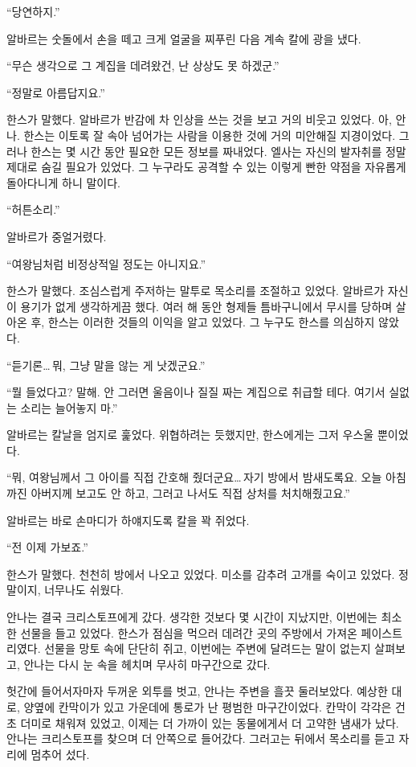 ``당연하지.''

알바르는 숫돌에서 손을 떼고 크게 얼굴을 찌푸린 다음 계속 칼에 광을 냈다.

``무슨 생각으로 그 계집을 데려왔건, 난 상상도 못 하겠군.''

``정말로 아름답지요.''

한스가 말했다. 알바르가 반감에 차 인상을 쓰는 것을 보고 거의 비웃고 있었다. 아, 안나. 한스는 이토록 잘 속아 넘어가는 사람을 이용한 것에 거의 미안해질 지경이었다. 그러나 한스는 몇 시간 동안 필요한 모든 정보를 짜내었다. 엘사는 자신의 발자취를 정말 제대로 숨길 필요가 있었다. 그 누구라도 공격할 수 있는 이렇게 빤한 약점을 자유롭게 돌아다니게 하니 말이다.

``허튼소리.''

알바르가 중얼거렸다.

``여왕님처럼 비정상적일 정도는 아니지요.''

한스가 말했다. 조심스럽게 주저하는 말투로 목소리를 조절하고 있었다. 알바르가 자신이 용기가 없게 생각하게끔 했다. 여러 해 동안 형제들 틈바구니에서 무시를 당하며 살아온 후, 한스는 이러한 것들의 이익을 알고 있었다. 그 누구도 한스를 의심하지 않았다.

``듣기론\ldots\,뭐, 그냥 말을 않는 게 낫겠군요.''

``뭘 들었다고? 말해. 안 그러면 울음이나 질질 짜는 계집으로 취급할 테다. 여기서 실없는 소리는 늘어놓지 마.''

알바르는 칼날을 엄지로 훑었다. 위협하려는 듯했지만, 한스에게는 그저 우스울 뿐이었다.

``뭐, 여왕님께서 그 아이를 직접 간호해 줬더군요\ldots\,자기 방에서 밤새도록요. 오늘 아침까진 아버지께 보고도 안 하고, 그러고 나서도 직접 상처를 처치해줬고요.''

알바르는 바로 손마디가 하얘지도록 칼을 꽉 쥐었다.

``전 이제 가보죠.''

한스가 말했다. 천천히 방에서 나오고 있었다. 미소를 감추려 고개를 숙이고 있었다. 정말이지, 너무나도 쉬웠다.

\textbreak

안나는 결국 크리스토프에게 갔다. 생각한 것보다 몇 시간이 지났지만, 이번에는 최소한 선물을 들고 있었다. 한스가 점심을 먹으러 데려간 곳의 주방에서 가져온 페이스트리였다. 선물을 망토 속에 단단히 쥐고, 이번에는 주변에 달려드는 말이 없는지 살펴보고, 안나는 다시 눈 속을 헤치며 무사히 마구간으로 갔다.

헛간에 들어서자마자 두꺼운 외투를 벗고, 안나는 주변을 흘끗 둘러보았다. 예상한 대로, 양옆에 칸막이가 있고 가운데에 통로가 난 평범한 마구간이었다. 칸막이 각각은 건초 더미로 채워져 있었고, 이제는 더 가까이 있는 동물에게서 더 고약한 냄새가 났다. 안나는 크리스토프를 찾으며 더 안쪽으로 들어갔다. 그러고는 뒤에서 목소리를 듣고 자리에 멈추어 섰다.

